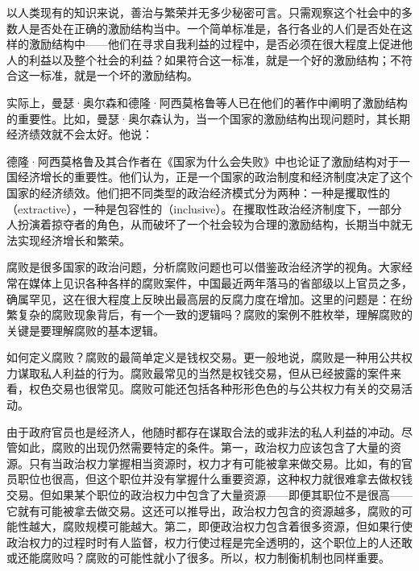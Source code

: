 以人类现有的知识来说，善治与繁荣并无多少秘密可言。只需观察这个社会中的多数人是否处在正确的激励结构当中。一个简单标准是，各行各业的人们是否处在这样的激励结构中——他们在寻求自我利益的过程中，是否必须在很大程度上促进他人的利益以及整个社会的利益？如果符合这一标准，就是一个好的激励结构；不符合这一标准，就是一个坏的激励结构。

实际上，曼瑟·奥尔森和德隆·阿西莫格鲁等人已在他们的著作中阐明了激励结构的重要性。比如，曼瑟·奥尔森认为，当一个国家的激励结构出现问题时，其长期经济绩效就不会太好。他说：


德隆·阿西莫格鲁及其合作者在《国家为什么会失败》中也论证了激励结构对于一国经济增长的重要性。他们认为，正是一个国家的政治制度和经济制度决定了这个国家的经济绩效。他们把不同类型的政治经济模式分为两种：一种是攫取性的（extractive），一种是包容性的（inclusive）。在攫取性政治经济制度下，一部分人扮演着掠夺者的角色，从而破坏了一个社会较为合理的激励结构，长期当中就无法实现经济增长和繁荣。


腐败是很多国家的政治问题，分析腐败问题也可以借鉴政治经济学的视角。大家经常在媒体上见识各种各样的腐败案件，中国最近两年落马的省部级以上官员之多，确属罕见，这在很大程度上反映出最高层的反腐力度在增加。这里的问题是：在纷繁复杂的腐败现象背后，有一个一致的逻辑吗？腐败的案例不胜枚举，理解腐败的关键是要理解腐败的基本逻辑。

如何定义腐败？腐败的最简单定义是钱权交易。更一般地说，腐败是一种用公共权力谋取私人利益的行为。腐败最常见的当然是权钱交易，但从已经披露的案件来看，权色交易也很常见。腐败可能还包括各种形形色色的与公共权力有关的交易活动。

由于政府官员也是经济人，他随时都存在谋取合法的或非法的私人利益的冲动。尽管如此，腐败的出现仍然需要特定的条件。第一，政治权力应该包含了大量的资源。只有当政治权力掌握相当资源时，权力才有可能被拿来做交易。比如，有的官员职位也很高，但这个职位并没有掌握什么重要资源，这种权力就很难拿去做权钱交易。但如果某个职位的政治权力中包含了大量资源——即便其职位不是很高——它就有可能被拿去做交易。这还可以推导出，政治权力包含的资源越多，腐败的可能性越大，腐败规模可能越大。第二，即便政治权力包含着很多资源，但如果行使政治权力的过程时时有人监督，权力行使过程是完全透明的，这个职位上的人还敢或还能腐败吗？腐败的可能性就小了很多。所以，权力制衡机制也同样重要。

